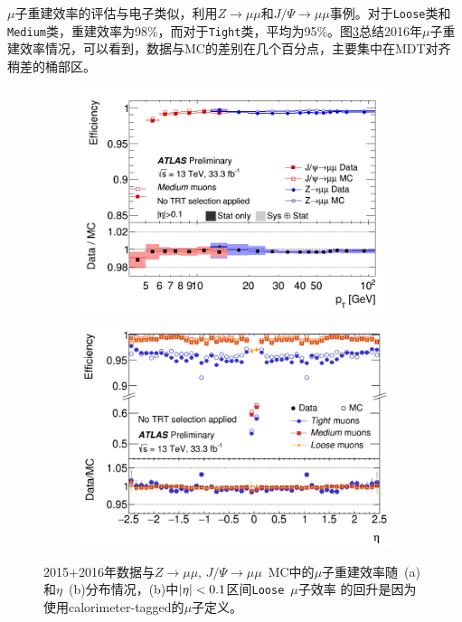$\mu$子重建效率的评估与电子类似，利用$Z\rightarrow \mu\mu$和$J/\Psi\rightarrow \mu\mu$事例\cite{Aad2016-mu2016}。对于\texttt{Loose}类和\texttt{Medium}类，重建效率为98\%，而对于\texttt{Tight}类，平均为95\%。图\ref{fig:muon_reco_eff}总结2016年$\mu$子重建效率情况，可以看到，数据与MC的差别在几个百分点，主要集中在MDT对齐稍差的桶部区。
\begin{figure}[h]
\begin{center}
\begin{subfigure}[b]{0.45\textwidth}
\centering
      \includegraphics[width=\textwidth]{fig/muon_reco_eff_pt.png}
     \caption{}
      \label{fig:muon_reco_eff_pt}
  \end{subfigure}
 \begin{subfigure}[b]{0.45\textwidth}
 \centering
      \includegraphics[width=\textwidth]{fig/muon_reco_eff_eta.png}
      \caption{}
      \label{fig:muon_reco_eff_eta}
  \end{subfigure}
\caption{2015+2016年数据与$Z\rightarrow \mu\mu$,  $J/\Psi\rightarrow \mu\mu$~MC中的$\mu$子重建效率随\pT~(a)和$\eta$~(b)分布情况，(b)中$|\eta|<0.1$区间\texttt{Loose}~$\mu$子效率
的回升是因为使用calorimeter-tagged的$\mu$子定义。} 
 \label{fig:muon_reco_eff}
\end{center}
\end{figure}

